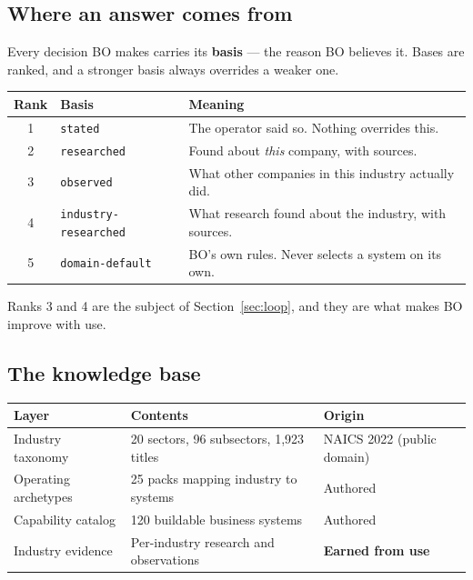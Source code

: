 \documentclass[11pt,a4paper]{article}
\newcommand{\term}[1]{\textcolor{boaccent}{\textbf{#1}}}
\begin{document}
\subsection{Where an answer comes from}

Every decision BO makes carries its \term{basis} --- the reason BO believes it. Bases are ranked,
and a stronger basis always overrides a weaker one.

\begin{center}
\begin{tabular}{@{}c l l@{}}
\toprule
\textbf{Rank} & \textbf{Basis} & \textbf{Meaning} \\
\midrule
1 & \texttt{stated}              & The operator said so. Nothing overrides this. \\
2 & \texttt{researched}          & Found about \emph{this} company, with sources. \\
3 & \texttt{observed}            & What other companies in this industry actually did. \\
4 & \texttt{industry-researched} & What research found about the industry, with sources. \\
5 & \texttt{domain-default}      & BO's own rules. Never selects a system on its own. \\
\bottomrule
\end{tabular}
\end{center}

Ranks 3 and 4 are the subject of Section~\ref{sec:loop}, and they are what makes BO improve with
use.

\subsection{The knowledge base}

\begin{center}
\begin{tabular}{@{}l l l@{}}
\toprule
\textbf{Layer} & \textbf{Contents} & \textbf{Origin} \\
\midrule
Industry taxonomy    & 20 sectors, 96 subsectors, 1{,}923 titles & NAICS 2022 (public domain) \\
Operating archetypes & 25 packs mapping industry to systems      & Authored \\
Capability catalog   & 120 buildable business systems            & Authored \\
Industry evidence    & Per-industry research and observations    & \textbf{Earned from use} \\
\bottomrule
\end{tabular}
\end{center}
\end{document}
